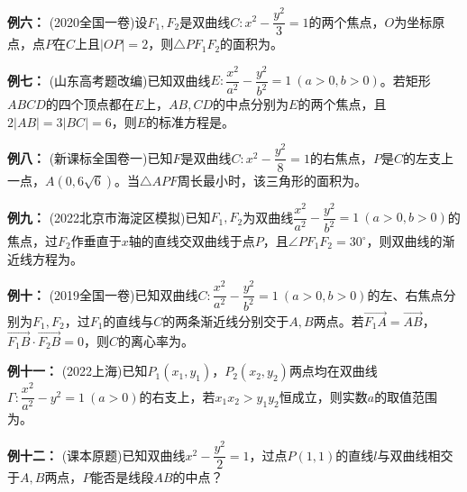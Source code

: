 \documentclass{article}
\begin{document}
\noindent\textbf{例六： }(2020全国一卷)设$F_1,F_2$是双曲线$C:x^2-\dfrac{y^2}{3}=1$的两个焦点，$O$为坐标原点，点$P$在$C$上且$|OP|=2$，则$\triangle PF_1F_2$的面积为\underline{\hspace{5em}}。
\vspace{2\baselineskip}

\noindent\textbf{例七： }(山东高考题改编)已知双曲线$E:\dfrac{x^2}{a^2}-\dfrac{y^2}{b^2}=1\ (a>0,b>0)$。若矩形$ABCD$的四个顶点都在$E$上，$AB,CD$的中点分别为$E$的两个焦点，且$2|AB|=3|BC|=6$，则$E$的标准方程是\underline{\hspace{5em}}。
\vspace{2\baselineskip}

\noindent\textbf{例八： }(新课标全国卷一)已知$F$是双曲线$C:x^2-\dfrac{y^2}{8}=1$的右焦点，$P$是$C$的左支上一点，$A\left(0,6\sqrt{6}\right)$。当$\triangle APF$周长最小时，该三角形的面积为\underline{\hspace{5em}}。
\vspace{2\baselineskip}

\noindent\textbf{例九： }(2022北京市海淀区模拟)已知$F_1,F_2$为双曲线$\dfrac{x^2}{a^2}-\dfrac{y^2}{b^2}=1\ (a>0,b>0)$的焦点，过$F_2$作垂直于$x$轴的直线交双曲线于点$P$，且$\angle PF_1F_2=30^\circ$，则双曲线的渐近线方程为\underline{\hspace{5em}}。
\vspace{2\baselineskip}

\noindent\textbf{例十： }(2019全国一卷)已知双曲线$C:\dfrac{x^2}{a^2}-\dfrac{y^2}{b^2}=1\ (a>0,b>0)$的左、右焦点分别为$F_1,F_2$，过$F_1$的直线与$C$的两条渐近线分别交于$A,B$两点。若$\overrightarrow{F_1A}=\overrightarrow{AB}$，$\overrightarrow{F_1B}\cdot\overrightarrow{F_2B}=0$，则$C$的离心率为\underline{\hspace{5em}}。
\vspace{2\baselineskip}

\noindent\textbf{例十一： }(2022上海)已知$P_1(x_1,y_1)$，$P_2(x_2,y_2)$两点均在双曲线$\Gamma:\dfrac{x^2}{a^2}-y^2=1\ (a>0)$的右支上，若$x_1x_2>y_1y_2$恒成立，则实数$a$的取值范围为\underline{\hspace{5em}}。
\vspace{2\baselineskip}

\noindent\textbf{例十二： }(课本原题)已知双曲线$x^2-\dfrac{y^2}{2}=1$，过点$P(1,1)$的直线$l$与双曲线相交于$A,B$两点，$P$能否是线段$AB$的中点？
\vspace{2\baselineskip}
 \vspace{2\baselineskip}
 \vspace{2\baselineskip}
\end{document}
